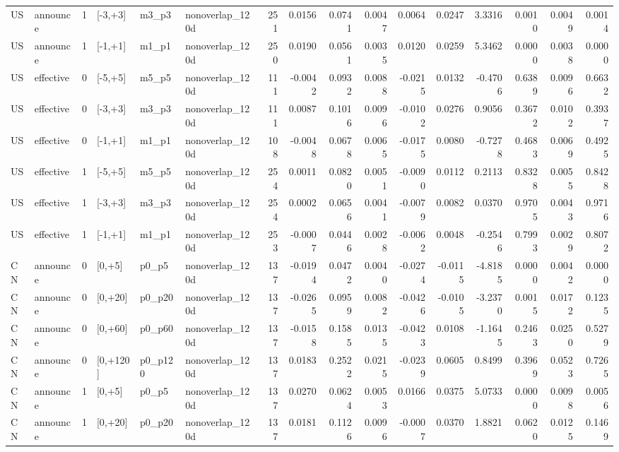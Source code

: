 \begin{tabular}{llrlllrrrrrrrrrr}
US & announce & 1 & [-3,+3] & m3_p3 & nonoverlap_120d & 251 & 0.0156 & 0.0741 & 0.0047 & 0.0064 & 0.0247 & 3.3316 & 0.0010 & 0.0049 & 0.0014 \\
US & announce & 1 & [-1,+1] & m1_p1 & nonoverlap_120d & 250 & 0.0190 & 0.0561 & 0.0035 & 0.0120 & 0.0259 & 5.3462 & 0.0000 & 0.0038 & 0.0000 \\
US & effective & 0 & [-5,+5] & m5_p5 & nonoverlap_120d & 111 & -0.0042 & 0.0932 & 0.0088 & -0.0215 & 0.0132 & -0.4706 & 0.6389 & 0.0096 & 0.6632 \\
US & effective & 0 & [-3,+3] & m3_p3 & nonoverlap_120d & 111 & 0.0087 & 0.1016 & 0.0096 & -0.0102 & 0.0276 & 0.9056 & 0.3672 & 0.0102 & 0.3937 \\
US & effective & 0 & [-1,+1] & m1_p1 & nonoverlap_120d & 108 & -0.0048 & 0.0678 & 0.0065 & -0.0175 & 0.0080 & -0.7278 & 0.4683 & 0.0069 & 0.4925 \\
US & effective & 1 & [-5,+5] & m5_p5 & nonoverlap_120d & 254 & 0.0011 & 0.0820 & 0.0051 & -0.0090 & 0.0112 & 0.2113 & 0.8328 & 0.0055 & 0.8428 \\
US & effective & 1 & [-3,+3] & m3_p3 & nonoverlap_120d & 254 & 0.0002 & 0.0656 & 0.0041 & -0.0079 & 0.0082 & 0.0370 & 0.9705 & 0.0043 & 0.9716 \\
US & effective & 1 & [-1,+1] & m1_p1 & nonoverlap_120d & 253 & -0.0007 & 0.0446 & 0.0028 & -0.0062 & 0.0048 & -0.2546 & 0.7993 & 0.0029 & 0.8072 \\
CN & announce & 0 & [0,+5] & p0_p5 & nonoverlap_120d & 137 & -0.0194 & 0.0472 & 0.0040 & -0.0274 & -0.0115 & -4.8185 & 0.0000 & 0.0042 & 0.0000 \\
CN & announce & 0 & [0,+20] & p0_p20 & nonoverlap_120d & 137 & -0.0265 & 0.0959 & 0.0082 & -0.0426 & -0.0105 & -3.2370 & 0.0015 & 0.0172 & 0.1235 \\
CN & announce & 0 & [0,+60] & p0_p60 & nonoverlap_120d & 137 & -0.0158 & 0.1585 & 0.0135 & -0.0423 & 0.0108 & -1.1645 & 0.2463 & 0.0250 & 0.5279 \\
CN & announce & 0 & [0,+120] & p0_p120 & nonoverlap_120d & 137 & 0.0183 & 0.2522 & 0.0215 & -0.0239 & 0.0605 & 0.8499 & 0.3969 & 0.0523 & 0.7265 \\
CN & announce & 1 & [0,+5] & p0_p5 & nonoverlap_120d & 137 & 0.0270 & 0.0624 & 0.0053 & 0.0166 & 0.0375 & 5.0733 & 0.0000 & 0.0098 & 0.0056 \\
CN & announce & 1 & [0,+20] & p0_p20 & nonoverlap_120d & 137 & 0.0181 & 0.1126 & 0.0096 & -0.0007 & 0.0370 & 1.8821 & 0.0620 & 0.0125 & 0.1469 \\

\end{tabular}
